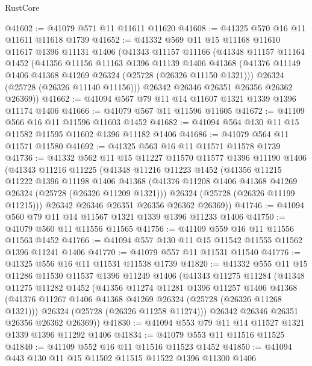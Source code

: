 \begin{lexlean}{RustCore}
\begin{coremodule}
@41602 := @41079 @571 @11 @11611 @11620
@41608 := @41325 @570 @16 @11 @11611 @11618 @1739
@41652 := @41332
    @569
    @11
    @15
    @11168
    @11610
    @11617
    @1396
    @11131
    @1406
    (@41343
      @11157
      @11166
      (@41348
        @11157
        @11164
        @1452
        (@41356
          @11156
          @11163
          @1396
          @11139
          @1406
          @41368
          (@41376 @11149 @1406 @41368 @41269 @26324 (@25728 (@26326 @11150 @1321)))
          @26324
          (@25728 (@26326 @11140 @11156)))
        @26342
        @26346
        @26351
        @26356
        @26362
        @26369))
@41662 := @41094 @567 @79 @11 @14 @11607 @1321 @1339 @1396 @11174 @1406
@41666 := @41079 @567 @11 @11596 @11605
@41672 := @41109 @566 @16 @11 @11596 @11603 @1452
@41682 := @41094 @564 @130 @11 @15 @11582 @11595 @11602 @1396 @11182 @1406
@41686 := @41079 @564 @11 @11571 @11580
@41692 := @41325 @563 @16 @11 @11571 @11578 @1739
@41736 := @41332
    @562
    @11
    @15
    @11227
    @11570
    @11577
    @1396
    @11190
    @1406
    (@41343
      @11216
      @11225
      (@41348
        @11216
        @11223
        @1452
        (@41356
          @11215
          @11222
          @1396
          @11198
          @1406
          @41368
          (@41376 @11208 @1406 @41368 @41269 @26324 (@25728 (@26326 @11209 @1321)))
          @26324
          (@25728 (@26326 @11199 @11215)))
        @26342
        @26346
        @26351
        @26356
        @26362
        @26369))
@41746 := @41094 @560 @79 @11 @14 @11567 @1321 @1339 @1396 @11233 @1406
@41750 := @41079 @560 @11 @11556 @11565
@41756 := @41109 @559 @16 @11 @11556 @11563 @1452
@41766 := @41094 @557 @130 @11 @15 @11542 @11555 @11562 @1396 @11241 @1406
@41770 := @41079 @557 @11 @11531 @11540
@41776 := @41325 @556 @16 @11 @11531 @11538 @1739
@41820 := @41332
    @555
    @11
    @15
    @11286
    @11530
    @11537
    @1396
    @11249
    @1406
    (@41343
      @11275
      @11284
      (@41348
        @11275
        @11282
        @1452
        (@41356
          @11274
          @11281
          @1396
          @11257
          @1406
          @41368
          (@41376 @11267 @1406 @41368 @41269 @26324 (@25728 (@26326 @11268 @1321)))
          @26324
          (@25728 (@26326 @11258 @11274)))
        @26342
        @26346
        @26351
        @26356
        @26362
        @26369))
@41830 := @41094 @553 @79 @11 @14 @11527 @1321 @1339 @1396 @11292 @1406
@41834 := @41079 @553 @11 @11516 @11525
@41840 := @41109 @552 @16 @11 @11516 @11523 @1452
@41850 := @41094 @443 @130 @11 @15 @11502 @11515 @11522 @1396 @11300 @1406

\end{coremodule}
\end{lexlean}
